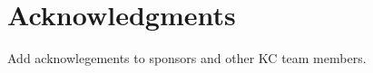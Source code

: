 \documentclass{ict4s_proc_article}
\begin{document}












\section{Acknowledgments}

Add acknowlegements to sponsors and other KC team members.



\balancecolumns
\end{document}
